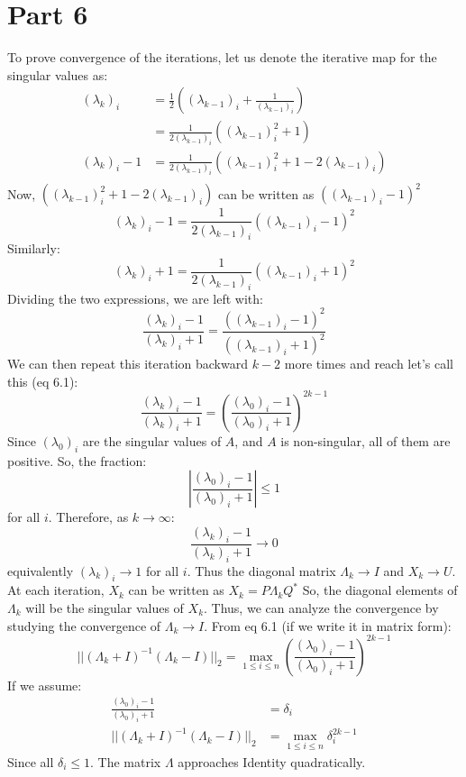 \documentclass{article}
\begin{document}
\section{Part 6}
To prove convergence of the iterations, let us denote the iterative map for the singular values as:
\begin{align*}
    (\lambda_{k})_i &= \frac{1}{2}((\lambda_{k-1})_i + \frac{1}{(\lambda_{k-1})_i})\\
    &= \frac{1}{2(\lambda_{k-1})_i}((\lambda_{k-1})^2_i + 1)\\
    (\lambda_{k})_i - 1 &= \frac{1}{2(\lambda_{k-1})_i}((\lambda_{k-1})^2_i + 1 - 2(\lambda_{k-1})_i)\\
\end{align*}
Now, $((\lambda_{k-1})^2_i + 1 - 2(\lambda_{k-1})_i)$ can be written as $((\lambda_{k-1})_i - 1)^2$
\[(\lambda_{k})_i - 1 = \frac{1}{2(\lambda_{k-1})_i}((\lambda_{k-1})_i - 1)^2\]
Similarly:
\[(\lambda_{k})_i + 1 = \frac{1}{2(\lambda_{k-1})_i}((\lambda_{k-1})_i + 1)^2\]
Dividing the two expressions, we are left with:
\[\frac{(\lambda_{k})_i - 1}{(\lambda_{k})_i + 1} = \frac{((\lambda_{k-1})_i - 1)^2}{((\lambda_{k-1})_i + 1)^2}\]
We can then repeat this iteration backward $k-2$ more times and reach let's call this (eq 6.1):
\[\frac{(\lambda_{k})_i - 1}{(\lambda_{k})_i + 1} = \left( \frac{(\lambda_{0})_i - 1}{(\lambda_{0})_i + 1} \right)^{2k-1}\]
Since $(\lambda_0)_i$ are the singular values of $A$, and $A$ is non-singular, all of them are positive. So, the fraction:
\[\left| \frac{(\lambda_{0})_i - 1}{(\lambda_{0})_i + 1} \right| \leq 1\]
for all $i$. Therefore, as $k\to\infty$:
\[\frac{(\lambda_{k})_i - 1}{(\lambda_{k})_i + 1} \to 0\] 
equivalently $(\lambda_k)_i \to 1$ for all $i$.
Thus the diagonal matrix $\Lambda_k \to I$ and $X_k \to U$. 
At each iteration, $X_k$ can be written as $X_k = P \Lambda_k Q^*$
So, the diagonal elements of $\Lambda_k$ will be the singular values of $X_k$. Thus, we can analyze the convergence by studying the convergence of $\Lambda_k \to I$. From eq 6.1 (if we write it in matrix form):
\[||(\Lambda_k + I)^{-1} (\Lambda_k - I)||_2 = \max\limits_{1\leq i \leq n}\left( \frac{(\lambda_{0})_i - 1}{(\lambda_{0})_i + 1} \right)^{2k-1}\]
If we assume:
\begin{align*}
    \frac{(\lambda_{0})_i - 1}{(\lambda_{0})_i + 1} &= \delta_i\\
    ||(\Lambda_k + I)^{-1} (\Lambda_k - I)||_2 &= \max\limits_{1\leq i \leq n}\delta_i^{2k-1}
\end{align*}
Since all $\delta_i \leq 1$. The matrix $\Lambda$ approaches Identity quadratically.
\end{document}
